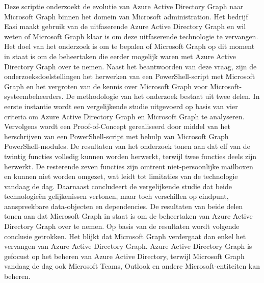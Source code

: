 Deze scriptie onderzoekt de evolutie van Azure Active Directory Graph naar Microsoft Graph binnen het domein van Microsoft administration. Het bedrijf Easi maakt gebruik van de uitfaserende Azure Active Directory Graph en wil weten of Microsoft Graph klaar is om deze uitfaserende technologie te vervangen. Het doel van het onderzoek is om te bepalen of Microsoft Graph op dit moment in staat is om de beheertaken die eerder mogelijk waren met Azure Active Directory Graph over te nemen. Naast het beantwoorden van deze vraag, zijn de onderzoeksdoelstellingen het herwerken van een PowerShell-script met Microsoft Graph en het vergroten van de kennis over Microsoft Graph voor Microsoft-systeembeheerders. De methodologie van het onderzoek bestaat uit twee delen. In eerste instantie wordt een vergelijkende studie uitgevoerd op basis van vier criteria om Azure Active Directory Graph en Microsoft Graph te analyseren. Vervolgens wordt een Proof-of-Concept gerealiseerd door middel van het herschrijven van een PowerShell-script met behulp van Microsoft Graph PowerShell-modules. De resultaten van het onderzoek tonen aan dat elf van de twintig functies volledig kunnen worden herwerkt, terwijl twee functies deels zijn herwerkt. De resterende zeven functies zijn omtrent niet-persoonlijke mailboxen en kunnen niet worden omgezet, wat leidt tot limitaties van de technologie vandaag de dag. Daarnaast concludeert de vergelijkende studie dat beide technologieën gelijkenissen vertonen, maar toch verschillen op eindpunt, aanspreekbare data-objecten en dependencies. De resultaten van beide delen tonen aan dat Microsoft Graph in staat is om de beheertaken van Azure Active Directory Graph over te nemen. Op basis van de resultaten wordt volgende conclusie getrokken. Het blijkt dat Microsoft Graph verdergaat dan enkel het vervangen van Azure Active Directory Graph. Azure Active Directory Graph is gefocust op het beheren van Azure Active Directory, terwijl Microsoft Graph vandaag de dag ook Microsoft Teams, Outlook en andere Microsoft-entiteiten kan beheren. 



